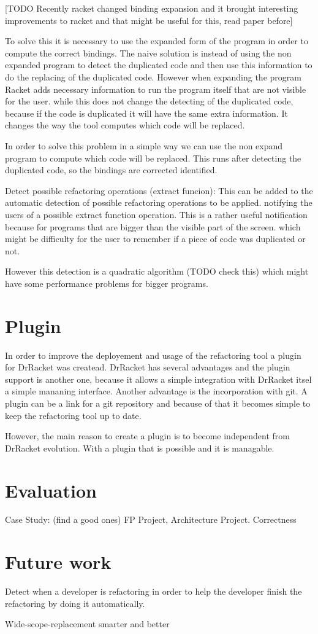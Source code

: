 [TODO Recently racket changed binding expansion and it brought interesting improvements
to racket and that might be useful for this, read paper before]

To solve this it is necessary to use the expanded form of the program in order
to compute the correct bindings. The naive solution is instead of using the
non expanded program to detect the duplicated code and then use this information
to do the replacing of the duplicated code. However when expanding the program
Racket adds necessary information to run the program itself that are not visible
for the user. while this does not change the detecting of the duplicated code,
because if the code is duplicated it will have the same extra information. It changes
the way the tool computes which code will be replaced.

In order to solve this problem in a simple way we can use the non expand program
to compute which code will be replaced. This runs after detecting the duplicated
code, so the bindings are corrected identified.

Detect possible refactoring operations (extract funcion):
This can be added to the automatic detection of possible refactoring operations
to be applied. notifying the users of a possible extract function operation.
This is a rather useful notification because for programs that are bigger than the
visible part of the screen. which might be difficulty for the user to remember
if a piece of code was duplicated or not.

However this detection is a quadratic algorithm (TODO check this) which might
have some performance problems for bigger programs.

\section{Plugin}
In order to improve the deployement and usage of the refactoring tool a plugin
for DrRacket was createad.
DrRacket has several advantages and the plugin support is another one, because
it allows a simple integration with DrRacket itsel a simple mananing interface.
Another advantage is the incorporation with git. A plugin can be a link for a git
repository and because of that it becomes simple to keep the refactoring tool up to date.

However, the main reason to create a plugin is to become independent from DrRacket
evolution. With a plugin that is possible and it is managable.

\section{Evaluation}
Case Study: (find a good ones) FP Project, Architecture Project.
Correctness
\section{Future work}
Detect when a developer is refactoring in order to help the developer finish the
refactoring by doing it automatically.

Wide-scope-replacement smarter and better
